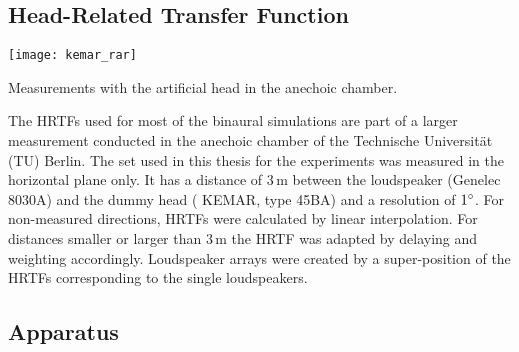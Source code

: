 \subsection{Head-Related Transfer Function}
\label{sec:head-related-transfer-function}

\begin{marginfigure}
    \texttt{[image: kemar\_rar]}
    \label{fig:kemar}
    \caption{Measurements with the artificial head in the anechoic chamber.
    }
\end{marginfigure}

The \acp{HRTF} used for most of the binaural simulations
are part of a larger measurement conducted in the anechoic chamber of the
Technische Universität ({\small TU}) Berlin.\autocite[The \ac{HRTF} set is
\href{https://dev.qu.tu-berlin.de/projects/measurements/wiki/2010-11-kemar-anechoic}
{\color{link}{freely available}},
and is described in][]{Wierstorf2011a}\autocite[The author would like to
recommend the \href{https://sourceforge.net/projects/sofacoustics/}{} format for the reader that is interested in \acp{HRTF}. It is a
joined effort between different labs to define a common file format for exchanging
\acp{HRTF} and other spatial oriented acoustical measurements. It is 
described in][]{Majdak2013}
The set used in this thesis for the experiments was measured in the horizontal
plane only. It has a distance of
$3$\,m between the loudspeaker (Genelec 8030A) and the dummy head ({\small
KEMAR}, type
45BA) and a resolution of $1^\circ$.
For non-measured directions, \acp{HRTF} were calculated by linear interpolation.
For distances smaller or
larger than $3$\,m the \ac{HRTF} was adapted by delaying and weighting accordingly.
Loudspeaker arrays were created by a super-position of the \acp{HRTF}
corresponding to the single loudspeakers.


\subsection{Apparatus}
\label{sec:apparatus}


